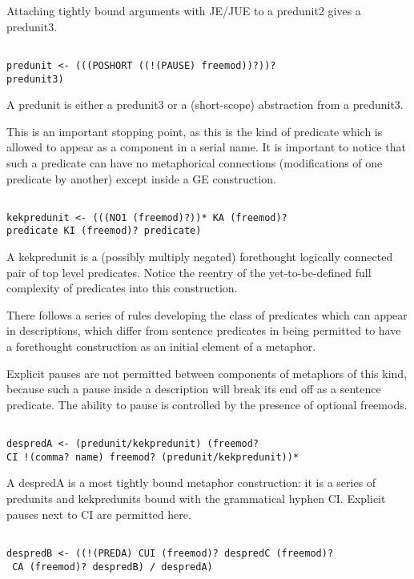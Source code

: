 \documentclass[12pt]{article}
\begin{document}
Attaching tightly bound arguments with JE/JUE to a predunit2 gives a predunit3.

\begin{verbatim}

predunit <- (((POSHORT ((!(PAUSE) freemod))?))? 
predunit3)

\end{verbatim}

A predunit is either a predunit3 or a (short-scope) abstraction from a predunit3.

This is an important stopping point, as this is the kind of predicate which is allowed to appear as a component in a serial name.
It is important to notice that such a predicate can have no metaphorical connections (modifications of one predicate by
another) except inside a GE construction.

\begin{verbatim}

kekpredunit <- (((NO1 (freemod)?))* KA (freemod)? 
predicate KI (freemod)? predicate)

\end{verbatim}

A kekpredunit is a (possibly multiply negated) forethought logically connected pair of top level predicates.
Notice the reentry of the yet-to-be-defined full complexity of predicates into this construction.

There follows a series of rules developing the class of predicates which can appear in descriptions, which differ from sentence predicates in being permitted to have a forethought construction as an initial element of a metaphor.

Explicit pauses are not permitted between components of metaphors of this kind, because such a pause
inside a description will break its end off as a sentence predicate.  The ability to pause is controlled by the presence
of optional freemods.

\begin{verbatim}

despredA <- (predunit/kekpredunit) (freemod? 
CI !(comma? name) freemod? (predunit/kekpredunit))*

\end{verbatim}

A despredA is a most tightly bound metaphor construction:  it is a series of predunits and kekpredunits bound with the grammatical hyphen CI.  Explicit pauses next to CI are permitted here.

\begin{verbatim}

despredB <- ((!(PREDA) CUI (freemod)? despredC (freemod)?
 CA (freemod)? despredB) / despredA)

\end{verbatim}
\end{document}
